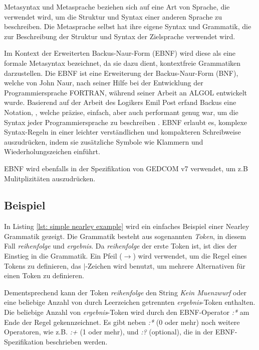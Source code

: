 Metasyntax und Metasprache beziehen sich auf eine Art von Sprache, die verwendet wird, um die Struktur und Syntax einer anderen Sprache zu beschreiben. 
Die Metasprache selbst hat ihre eigene Syntax und Grammatik, die zur Beschreibung der Struktur und Syntax der Zielsprache verwendet wird.

Im Kontext der Erweiterten Backus-Naur-Form (EBNF) wird diese als eine formale Metasyntax bezeichnet, da sie dazu dient, kontextfreie Grammatiken 
darzustellen. Die EBNF ist eine Erweiterung der Backus-Naur-Form (BNF), welche von John Naur, nach seiner Hilfe bei der Entwicklung der Programmiersprache
FORTRAN, während seiner Arbeit an ALGOL entwickelt wurde. Basierend auf der Arbeit des Logikers Emil Post erfand Backus eine Notation, ,
welche präzise, einfach, aber auch performant genug war, um die Syntax jeder Programmiersprache zu beschreiben \cite{Feynman2016}. 
EBNF erlaubt es, komplexe Syntax-Regeln in einer leichter verständlichen und kompakteren Schreibweise auszudrücken, indem sie zusätzliche Symbole
wie Klammern und Wiederholungszeichen einführt.

EBNF wird ebenfalls in der Spezifikation von GEDCOM v7 verwendet, um z.B Mulitplizitäten auszudrücken.

\subsection*{Beispiel}

In Listing \ref*{lst: simple nearley example} wird ein einfaches Beispiel einer Nearley Grammatik gezeigt. 
Die Grammatik besteht aus sogenannten \textit{Token}, in diesem Fall \textit{reihenfolge} und \textit{ergebnis}.
Da \textit{reihenfolge} der erste Token ist, ist dies der Einstieg in die Grammatik. 
Ein Pfeil ($\rightarrow$) wird verwendet, um die Regel eines Tokens zu definieren, das $\vert$-Zeichen wird benutzt, 
um mehrere Alternativen für einen Token zu definieren.

Dementsprechend kann der Token \textit{reihenfolge} den String \textit{Kein Muenzwurf} oder eine beliebige Anzahl
von durch Leerzeichen getrennten \textit{ergebnis}-Token enthalten.\\

Die beliebige Anzahl von \textit{ergebnis}-Token wird durch den EBNF-Operator \textit{:*} am Ende der Regel gekennzeichnet.
Es gibt neben \textit{:*} (0 oder mehr) noch weitere Operatoren, wie z.B. \textit{:+} (1 oder mehr), und \textit{:?} (optional), die in der EBNF-Spezifikation 
beschrieben werden.\\


